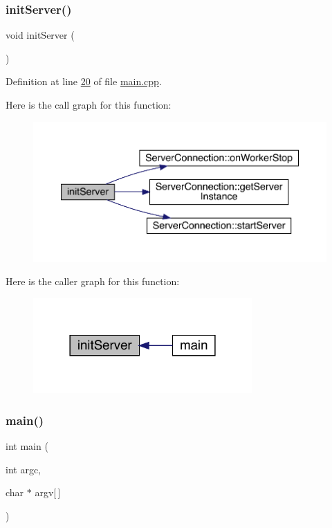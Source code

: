 \subsubsection{\texorpdfstring{init\+Server()}{initServer()}}
{\footnotesize\ttfamily void init\+Server (\begin{DoxyParamCaption}{ }\end{DoxyParamCaption})}



Definition at line \hyperlink{a00241_source_l00020}{20} of file \hyperlink{a00241_source}{main.\+cpp}.

Here is the call graph for this function\+:
\nopagebreak
\begin{figure}[H]
\begin{center}
\leavevmode
\includegraphics[width=350pt]{d6/db6/a00241_a29060721f5ddfa26790f0778bde74ff2_cgraph}
\end{center}
\end{figure}
Here is the caller graph for this function\+:
\nopagebreak
\begin{figure}[H]
\begin{center}
\leavevmode
\includegraphics[width=237pt]{d6/db6/a00241_a29060721f5ddfa26790f0778bde74ff2_icgraph}
\end{center}
\end{figure}
\mbox{\label{a00241_a0ddf1224851353fc92bfbff6f499fa97}} 
\subsubsection{\texorpdfstring{main()}{main()}}
{\footnotesize\ttfamily int main (\begin{DoxyParamCaption}\item[{int}]{argc,  }\item[{char $\ast$}]{argv\mbox{[}$\,$\mbox{]} }\end{DoxyParamCaption})}



